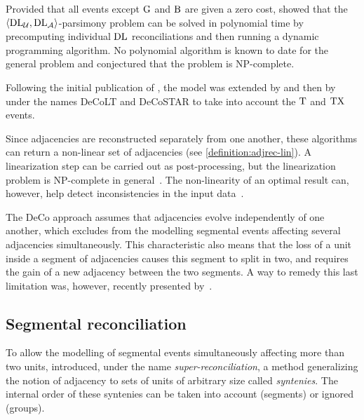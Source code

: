 Provided that all events except \(\mathrm{G}\) and \(\mathrm{B}\) are given a zero cost, \textcite{Berard2012EvolutionGeneNeighborhoods} showed that the \(\left\langle\mathrm{D}\mathrm{L}\mathcal{_U}, \mathrm{D}\mathrm{L}\mathcal{_A}\right\rangle\)-parsimony problem can be solved in polynomial time by precomputing individual \(\mathrm{D}\mathrm{L}\) reconciliations and then running a dynamic programming algorithm.
No polynomial algorithm is known to date for the general problem and \textcite{Boussau2020ReconcilingGeneTrees} conjectured that the problem is NP-complete.

Following the initial publication of \textcite{Berard2012EvolutionGeneNeighborhoods}, the model was extended by \textcite{Patterson2013LateralGeneTransfer} and then by \textcite{Duchemin2017DecostarReconstructingAncestral} under the names DeCoLT and DeCoSTAR to take into account the \(\mathrm{T}\) and \(\mathrm{TX}\) events.

Since adjacencies are reconstructed separately from one another, these algorithms can return a non-linear set of adjacencies (see \cref{definition:adjrec-lin}).
A linearization step can be carried out as post-processing, but the linearization problem is NP-complete in general~\parencite{Manuch2012LinearizationAncestralMultichromosomal}.
The non-linearity of an optimal result can, however, help detect inconsistencies in the input data~\parencite{Tannier2020AncestralGenomeOrganization}.

The DeCo approach assumes that adjacencies evolve independently of one another, which excludes from the modelling segmental events affecting several adjacencies simultaneously.
This characteristic also means that the loss of a unit inside a segment of adjacencies causes this segment to split in two, and requires the gain of a new adjacency between the two segments.
A way to remedy this last limitation was, however, recently presented by~\textcite{Tannier2020AncestralGenomeOrganization}.

\subsection{Segmental reconciliation}\label{sec:reconciliation:multiple:segmental}

To allow the modelling of segmental events simultaneously affecting more than two units, \textcite{Delabre2020EvolutionSegmentalDuplications} introduced, under the name \emph{super-reconciliation}, a method generalizing the notion of adjacency to sets of units of arbitrary size called \emph{syntenies}.
The internal order of these syntenies can be taken into account (segments) or ignored (groups).

